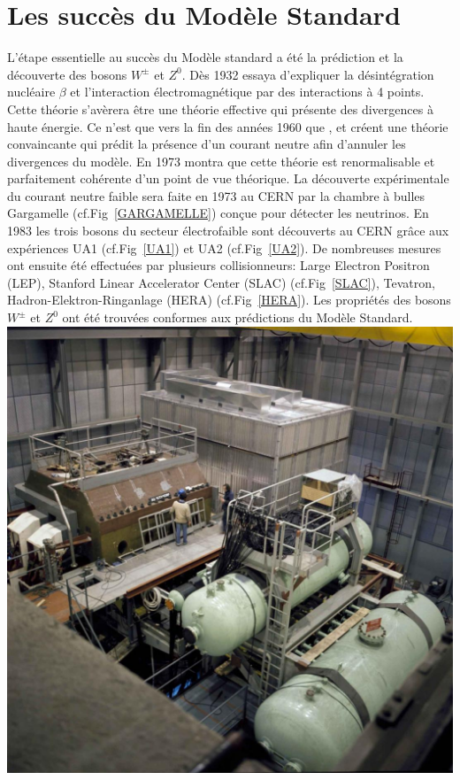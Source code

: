 \section{Les succès du Modèle Standard}
L'étape essentielle au succès du Modèle standard a été la prédiction et la découverte des bosons $W^{\pm}$ et $Z^{0}$. Dès \num{1932}  essaya d'expliquer la désintégration nucléaire $\beta$ et l'interaction électromagnétique par des interactions à \num{4} points. Cette théorie  s'avèrera être une théorie effective qui présente des divergences à haute énergie. Ce n'est que vers la fin des années \num{1960} que ,  et  créent une théorie convaincante qui prédit la présence d'un courant neutre afin d'annuler les divergences du modèle. En \num{1973}  montra que cette théorie est renormalisable et parfaitement cohérente d'un point de vue théorique. La découverte expérimentale du courant neutre faible sera faite en \num{1973} au CERN par la chambre à bulles Gargamelle (cf.Fig~\ref{GARGAMELLE}) conçue pour détecter les neutrinos. En \num{1983} les trois bosons du secteur électrofaible sont découverts au CERN grâce aux expériences UA1 (cf.Fig~\ref{UA1}) et UA2 (cf.Fig~\ref{UA2}). De nombreuses mesures ont ensuite été effectuées par plusieurs collisionneurs: Large Electron Positron (LEP), Stanford Linear Accelerator Center (SLAC) (cf.Fig~\ref{SLAC}), Tevatron, Hadron-Elektron-Ringanlage (HERA) (cf.Fig~\ref{HERA}). Les propriétés des bosons $W^{\pm}$ et $Z^{0}$ ont été trouvées conformes aux prédictions du Modèle Standard. 
\marginpar
{
	\centering
	\includegraphics[width=\marginparwidth]{SM/gargamelle.jpg}
	\label{GARGAMELLE}
}
